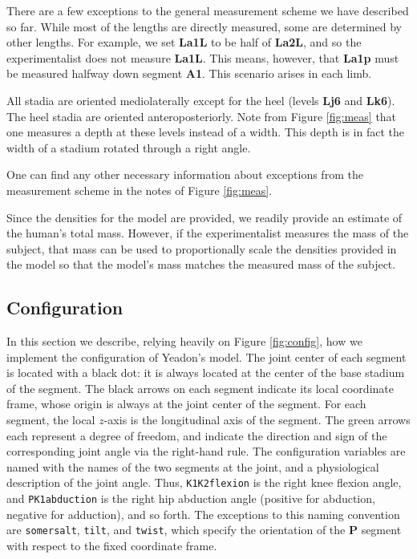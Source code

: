 \documentclass[10pt]{article}
\begin{document}
There are a few exceptions to the general measurement scheme we have described
so far. While most of the lengths are directly measured, some are determined by
other lengths. For example, we set \textbf{La1L} to be half of \textbf{La2L},
and so the experimentalist does not measure \textbf{La1L}. This means, however,
that \textbf{La1p} must be measured halfway down segment \textbf{A1}. This
scenario arises in each limb.

All stadia are oriented mediolaterally except for the heel (levels
\textbf{Lj6} and \textbf{Lk6}). The heel stadia are oriented anteroposteriorly.
Note from Figure \ref{fig:meas} that one measures a depth at these levels
instead of a width. This depth is in fact the width of a stadium rotated
through a right angle.

One can find any other necessary information about exceptions from the
measurement scheme in the notes of Figure \ref{fig:meas}.

Since the densities for the model are provided, we readily provide an estimate
of the human's total mass. However, if the experimentalist measures the mass of
the subject, that mass can be used to proportionally scale the densities
provided in the model so that the model's mass matches the measured mass of the
subject.

\subsection*{Configuration}

In this section we describe, relying heavily on Figure \ref{fig:config}, how we
implement the configuration of Yeadon's model. The joint center of each
segment is located with a black dot: it is always located at the center of the
base stadium of the segment. The black arrows on each segment indicate its
local coordinate frame, whose origin is always at the joint center of the
segment. For each segment, the local $z$-axis is the longitudinal axis of the
segment. The green arrows each represent a degree of freedom, and indicate the
direction and sign of the corresponding joint angle via the right-hand rule.
The configuration variables are named with the names of the two segments at
the joint, and a physiological description of the joint angle. Thus,
\verb+K1K2flexion+ is the right knee flexion angle, and \verb+PK1abduction+ is
the right hip abduction angle (positive for abduction, negative for adduction),
and so forth. The exceptions to this naming convention are \verb+somersalt+,
\verb+tilt+, and \verb+twist+, which specify the orientation of the \textbf{P}
segment with respect to the fixed coordinate frame.
\end{document}
